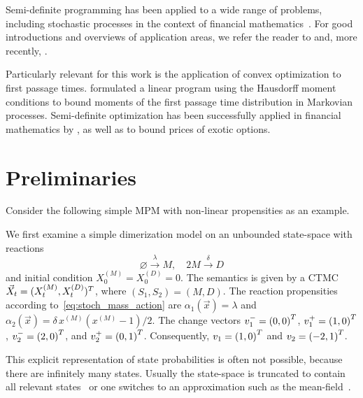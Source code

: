 Semi-definite programming has been applied to a wide range of problems,
including stochastic processes in the context of financial
mathematics~\cite{lasserre2006pricing,kashima2009polynomial}.
For good introductions and overviews of application areas, we refer
the reader to \citet{parrilo2003semidefinite} and, more recently,
\citet{lasserre2010moments}.

Particularly relevant for this work is the application of convex optimization to
first passage times.
\citet{helmes2001computing} formulated a linear program using the
Hausdorff moment conditions to bound moments of the
first passage time distribution in Markovian processes.
Semi-definite optimization has been successfully applied in financial
mathematics by \citet{kashima2009polynomial}, as well as
\citet{lasserre2006pricing} to bound prices of exotic options.

\section{Preliminaries}\label{sec:mfpt:bg}


Consider the following simple MPM with non-linear propensities as an example.
\begin{model}[Dimerization]\label{model:dim}
  We first examine a simple dimerization model on an unbounded state-space with
  reactions
  $$\varnothing\xrightarrow{\lambda}M,\quad 2M\xrightarrow{\delta}D$$
  and initial condition $X_0^{(M)}=X_0^{(D)}=0$. The semantics is given by a
  CTMC
  $\vec{X}_t=(X_t^{(M)}, X_t^{(D)})^{T}$, where $(S_1, S_2)=(M,D)$. The reaction
  propensities according to~\eqref{eq:stoch_mass_action}
  are $\alpha_1(\vec{x})=\lambda$ and $\alpha_2(\vec{x})=\delta\, x^{(M)} (x^{(M)} -
  1)/2$. The change vectors $v_1^-={(0,0)}^{T}$, $v_1^+={(1,0)}^{T}$,
  $v_2^-={(2,0)}^{T}$, and $v_2^{+}={(0,1)}^{T}$.
  Consequently, $v_1={(1,0)}^{T}$ and $v_2={(-2, 1)}^{T}$.
\end{model}

This explicit representation of state probabilities is often not possible, because
there are infinitely many states. Usually the state-space is truncated to contain all
relevant states~\cite{andreychenko2011parameter} or one switches to
an approximation such as the mean-field~\cite{bortolussi2013}.

